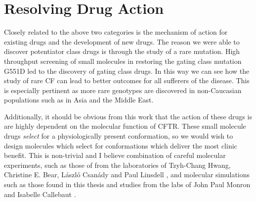 \section{Resolving Drug Action}
Closely related to the above two categories is the mechanism of action for existing drugs and the development of new drugs. The reason we were able to discover potentiator class drugs is through the study of a rare mutation. High throughput screening of small molecules in restoring the gating class mutation G551D led to the discovery of gating class drugs. In this way we can see how the study of rare CF can lead to better outcomes for all sufferers of the disease. This is especially pertinent as more rare genotypes are discovered in non-Caucasian populations such as in Asia and the Middle East. 

Additionally, it should be obvious from this work that the action of these drugs is are highly dependent on the molecular function of CFTR. These small molecule drugs \textit{select} for a physiologically present conformation, so we would wish to design molecules which select for conformations which deliver the most clinic benefit. This is non-trivial and I believe  combination of careful molecular experiments, such as those of from the laboratories of Tzyh-Chang Hwang,  Christine E. Bear, L\'aszl\'o Csan\'ady and Paul Linsdell \cite{linsdell2018, csanady2019, zhang2017b}, and molecular simulations such as those found in this thesis and studies from the labs of John Paul Monron and Isabelle Callebaut \cite{hoffman2018}.
